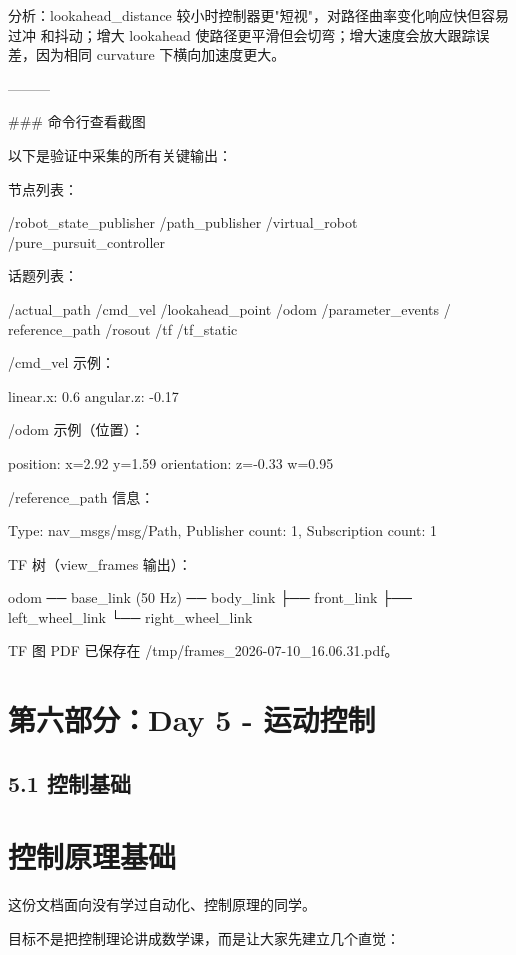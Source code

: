 \documentclass[a4paper,12pt]{book}
\begin{document}
{  分析：lookahead\_distance 较小时控制器更"短视"，对路径曲率变化响应快但容易过冲
  和抖动；增大 lookahead 使路径更平滑但会切弯；增大速度会放大跟踪误差，因为相同
  curvature 下横向加速度更大。

  ———

  ### 命令行查看截图

  以下是验证中采集的所有关键输出：

  节点列表：

  /robot\_state\_publisher
  /path\_publisher
  /virtual\_robot
  /pure\_pursuit\_controller

  话题列表：

  /actual\_path  /cmd\_vel  /lookahead\_point  /odom  /parameter\_events  /
  reference\_path  /rosout  /tf  /tf\_static

  /cmd\_vel 示例：

  linear.x: 0.6  angular.z: -0.17

  /odom 示例（位置）：

  position: x=2.92  y=1.59  orientation: z=-0.33  w=0.95

  /reference\_path 信息：

  Type: nav\_msgs/msg/Path, Publisher count: 1, Subscription count: 1

  TF 树（view\_frames 输出）：

  odom ── base\_link (50 Hz) ── body\_link
                             ├── front\_link
                             ├── left\_wheel\_link
                             └── right\_wheel\_link

  TF 图 PDF 已保存在 /tmp/frames\_2026-07-10\_16.06.31.pdf。

\hrulefill

\chapter{第六部分：Day 5 - 运动控制}

\section{5.1 控制基础}

\chapter{控制原理基础}

这份文档面向没有学过自动化、控制原理的同学。

目标不是把控制理论讲成数学课，而是让大家先建立几个直觉：

}
\end{document}
